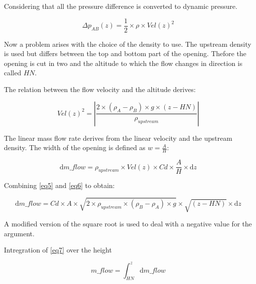 \documentclass[a4paper, english]{article}
\begin{document}
            Considering that all the pressure difference is converted to dynamic pressure.
            
            \begin{equation}
                \label{eq4}
                \Delta p_{AB}(z) = \frac{1}{2} \times \rho \times Vel(z)^2
            \end{equation}
            
            Now a problem arises with the choice of the density to use. The upstream density is used but differs between the top and bottom part of the opening. Thefore the opening is cut in two and the altitude to which the flow changes in direction is called $ HN $.
            
            The relation between the flow velocity and the altitude derives:
            
            \begin{equation}
                \label{eq5}
                Vel(z)^2 = \left| \frac{2 \times (\rho_A - \rho_B) \times g \times (z-HN)}{\rho_{upstream} } \right |
            \end{equation}
            
            The linear mass flow rate derives from the linear velocity and the upstream density. The width of the opening is defined as $ w = \frac{A}{H} $:
            
            \begin{equation}
                \label{eq6}
                \mathrm{d} m\_flow = \rho_{upstream} \times Vel(z) \times Cd \times \frac{A}{H} \times \mathrm{d} z
            \end{equation}
            
            Combining \eqref{eq5} and \eqref{eq6} to obtain:
            
            
            \begin{equation}
                \label{eq7}
                \mathrm{d} m\_flow = Cd \times A \times \sqrt{ 2 \times \rho_{upstream} \times ( \rho_B - \rho_A ) \times g } \times \sqrt{(z - HN)} \times \mathrm{d} z
            \end{equation}
            
            A modified version of the square root is used to deal with a negative value for the argument.
            
            Intregration of \eqref{eq7} over the height
            
            \begin{equation}
                \label{eq8}
                m\_flow = \int_{HN}^{z} \mathrm{d} m\_flow
            \end{equation}
            
\end{document}
